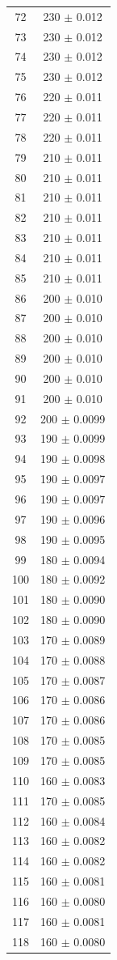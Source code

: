 \documentclass[a4paper]{instrumentacao}
\begin{document}
\begin{longtable}{cc}
 72 & 230 $\pm$ 0.012 \\
 73 & 230 $\pm$ 0.012 \\
 74 & 230 $\pm$ 0.012 \\
 75 & 230 $\pm$ 0.012 \\
 76 & 220 $\pm$ 0.011 \\
 77 & 220 $\pm$ 0.011 \\
 78 & 220 $\pm$ 0.011 \\
 79 & 210 $\pm$ 0.011 \\
 80 & 210 $\pm$ 0.011 \\
 81 & 210 $\pm$ 0.011 \\
 82 & 210 $\pm$ 0.011 \\
 83 & 210 $\pm$ 0.011 \\
 84 & 210 $\pm$ 0.011 \\
 85 & 210 $\pm$ 0.011 \\
 86 & 200 $\pm$ 0.010 \\
 87 & 200 $\pm$ 0.010 \\
 88 & 200 $\pm$ 0.010 \\
 89 & 200 $\pm$ 0.010 \\
 90 & 200 $\pm$ 0.010 \\
 91 & 200 $\pm$ 0.010 \\
 92 & 200 $\pm$ 0.0099 \\
 93 & 190 $\pm$ 0.0099 \\
 94 & 190 $\pm$ 0.0098 \\
 95 & 190 $\pm$ 0.0097 \\
 96 & 190 $\pm$ 0.0097 \\
 97 & 190 $\pm$ 0.0096 \\
 98 & 190 $\pm$ 0.0095 \\
 99 & 180 $\pm$ 0.0094 \\
 100 & 180 $\pm$ 0.0092 \\
 101 & 180 $\pm$ 0.0090 \\
 102 & 180 $\pm$ 0.0090 \\
 103 & 170 $\pm$ 0.0089 \\
 104 & 170 $\pm$ 0.0088 \\
 105 & 170 $\pm$ 0.0087 \\
 106 & 170 $\pm$ 0.0086 \\
 107 & 170 $\pm$ 0.0086 \\
 108 & 170 $\pm$ 0.0085 \\
 109 & 170 $\pm$ 0.0085 \\
 110 & 160 $\pm$ 0.0083 \\
 111 & 170 $\pm$ 0.0085 \\
 112 & 160 $\pm$ 0.0084 \\
 113 & 160 $\pm$ 0.0082 \\
 114 & 160 $\pm$ 0.0082 \\
 115 & 160 $\pm$ 0.0081 \\
 116 & 160 $\pm$ 0.0080 \\
 117 & 160 $\pm$ 0.0081 \\
 118 & 160 $\pm$ 0.0080 \\
\end{longtable}
\end{document}
